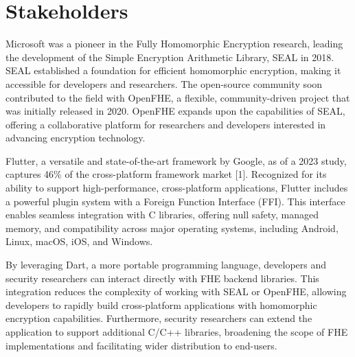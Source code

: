 \section{Stakeholders}
Microsoft was a pioneer in the Fully Homomorphic Encryption research, leading the development of the Simple Encryption Arithmetic Library, SEAL in 2018. SEAL established a foundation for efficient homomorphic encryption, making it accessible for developers and researchers. The open-source community soon contributed to the field with OpenFHE, a flexible, community-driven project that was initially released in 2020. OpenFHE expands upon the capabilities of SEAL, offering a collaborative platform for researchers and developers interested in advancing encryption technology.

Flutter, a versatile and state-of-the-art framework by Google, as of a 2023 study, captures 46\% of the cross-platform framework market [1]. Recognized for its ability to support high-performance, cross-platform applications, Flutter includes a powerful plugin system with a Foreign Function Interface (FFI). This interface enables seamless integration with C libraries, offering null safety, managed memory, and compatibility across major operating systems, including Android, Linux, macOS, iOS, and Windows.

By leveraging Dart, a more portable programming language, developers and security researchers can interact directly with FHE backend libraries. This integration reduces the complexity of working with SEAL or OpenFHE, allowing developers to rapidly build cross-platform applications with homomorphic encryption capabilities. Furthermore, security researchers can extend the application to support additional C/C++ libraries, broadening the scope of FHE implementations and facilitating wider distribution to end-users.
